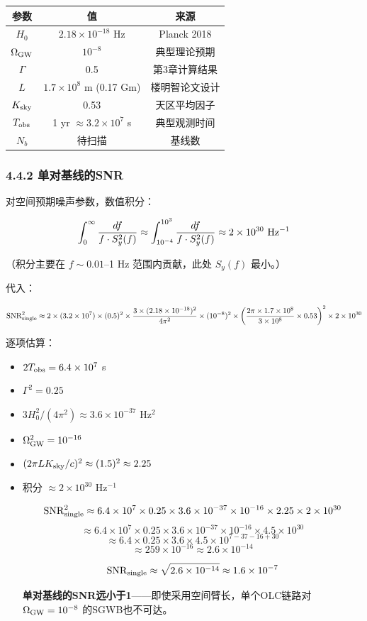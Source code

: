 \documentclass[12pt,a4paper]{article}
\begin{document}
\begin{tabular}{|c|c|c|}
\hline
参数 & 值 & 来源 \\
\hline
$H_0$ & $2.18 \times 10^{-18}$ Hz & Planck 2018 \\
$\Omega_{\rm GW}$ & $10^{-8}$ & 典型理论预期 \\
$\Gamma$ & 0.5 & 第3章计算结果 \\
$L$ & $1.7 \times 10^8$ m (0.17 Gm) & 楼明智论文设计 \\
$K_{\rm sky}$ & 0.53 & 天区平均因子 \\
$T_{\rm obs}$ & 1 yr $\approx 3.2 \times 10^7$ s & 典型观测时间 \\
$N_b$ & 待扫描 & 基线数 \\
\hline
\end{tabular}


\subsubsection{4.4.2 单对基线的SNR}


对空间预期噪声参数，数值积分：

$$\int_0^\infty \frac{df}{f \cdot S_y^2(f)} \approx \int_{10^{-4}}^{10^3} \frac{df}{f \cdot S_y^2(f)} \approx 2 \times 10^{30} \ {\rm Hz^{-1}}$$

（积分主要在 $f \sim 0.01$–1 Hz 范围内贡献，此处 $S_y(f)$ 最小。）

代入：

$${\rm SNR}_{\rm single}^2 \approx 2 \times (3.2 \times 10^7) \times (0.5)^2 \times \frac{3 \times (2.18 \times 10^{-18})^2}{4\pi^2} \times (10^{-8})^2 \times \left(\frac{2\pi \times 1.7 \times 10^8}{3 \times 10^8} \times 0.53\right)^2 \times 2 \times 10^{30}$$

逐项估算：
\begin{itemize}
  \item $2T_{\rm obs} = 6.4 \times 10^7$ s
  \item $\Gamma^2 = 0.25$
  \item $3H_0^2/(4\pi^2) \approx 3.6 \times 10^{-37}$ Hz$^2$
  \item $\Omega_{\rm GW}^2 = 10^{-16}$
  \item $(2\pi L K_{\rm sky}/c)^2 \approx (1.5)^2 \approx 2.25$
  \item 积分 $\approx 2 \times 10^{30}$ Hz$^{-1}$

$${\rm SNR}_{\rm single}^2 \approx 6.4 \times 10^7 \times 0.25 \times 3.6 \times 10^{-37} \times 10^{-16} \times 2.25 \times 2 \times 10^{30}$$
$$\approx 6.4 \times 10^7 \times 0.25 \times 3.6 \times 10^{-37} \times 10^{-16} \times 4.5 \times 10^{30}$$
$$\approx 6.4 \times 0.25 \times 3.6 \times 4.5 \times 10^{7-37-16+30}$$
$$\approx 259 \times 10^{-16} \approx 2.6 \times 10^{-14}$$

$${\rm SNR}_{\rm single} \approx \sqrt{2.6 \times 10^{-14}} \approx 1.6 \times 10^{-7}$$

\textbf{单对基线的SNR远小于1}——即使采用空间臂长，单个OLC链路对 $\Omega_{\rm GW} = 10^{-8}$ 的SGWB也不可达。

\end{itemize}
\end{document}
